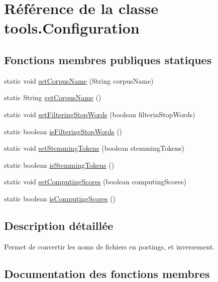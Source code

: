 \hypertarget{classtools_1_1Configuration}{}\section{Référence de la classe tools.\+Configuration}
\label{classtools_1_1Configuration}
\subsection*{Fonctions membres publiques statiques}
\begin{DoxyCompactItemize}
\item 
static void \hyperlink{classtools_1_1Configuration_aba2fd018e507593a824d6f4c41271089}{set\+Corpus\+Name} (String corpus\+Name)
\item 
static String \hyperlink{classtools_1_1Configuration_add970179543dd47b7f67980e0fbd84d9}{get\+Corpus\+Name} ()
\item 
static void \hyperlink{classtools_1_1Configuration_a1520b6e7f8a9a2f303813c73838d5a24}{set\+Filtering\+Stop\+Words} (boolean filterin\+Stop\+Words)
\item 
static boolean \hyperlink{classtools_1_1Configuration_ab64c49265c65926e4fdd088a4e5c5059}{is\+Filtering\+Stop\+Words} ()
\item 
static void \hyperlink{classtools_1_1Configuration_abe7544ea6ecb6c021fb2ac309bc59fbf}{set\+Stemming\+Tokens} (boolean stemming\+Tokens)
\item 
static boolean \hyperlink{classtools_1_1Configuration_a13b2348432050da67f4bf348972b9420}{is\+Stemming\+Tokens} ()
\item 
static void \hyperlink{classtools_1_1Configuration_a6641e3670ab246bfda71d332407f161f}{set\+Computing\+Scores} (boolean computing\+Scores)
\item 
static boolean \hyperlink{classtools_1_1Configuration_a4fc9e233e37fe826479bb43cce4a2f7a}{is\+Computing\+Scores} ()
\end{DoxyCompactItemize}


\subsection{Description détaillée}
Permet de convertir les noms de fichiers en postings, et inversement. 

\subsection{Documentation des fonctions membres}
\mbox{\label{classtools_1_1Configuration_add970179543dd47b7f67980e0fbd84d9}} 
